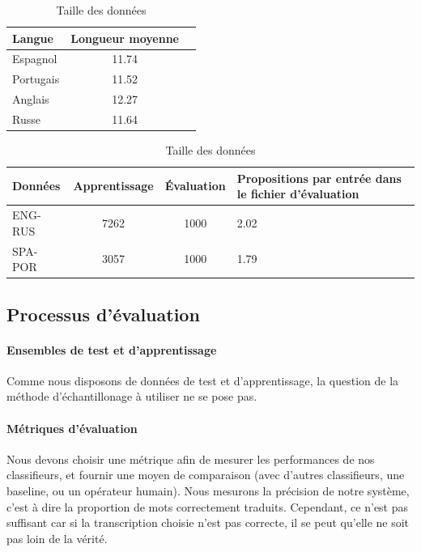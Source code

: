 \documentclass{article}
\begin{document}
\begin{table}[H]
\caption{Longueur moyenne des mots dans les données}
\label{table_len}
\label{table1}
\begin{center}
\begin{tabular}{|l|c|c|}
\hline
Langue&Longueur moyenne\\
\hline
Espagnol&11.74\\
\hline
Portugais&11.52\\
\hline
\hline
Anglais&12.27\\
\hline
Russe&11.64\\
\hline
\end{tabular}
\end{center}

\caption{Taille des données}
\label{table2}
\begin{center}
    \begin{tabular}{|l|c|c|p{4cm}|}
\hline
Données&Apprentissage&Évaluation&Propositions par entrée dans le fichier d'évaluation\\
\hline
ENG-RUS&7262&1000&2.02\\
\hline
SPA-POR&3057&1000&1.79\\
\hline
\end{tabular}
\end{center}

\end{table}

\subsection{Processus d'évaluation}
\label{eval}
\paragraph{Ensembles de test et d'apprentissage}
Comme nous disposons de données de test et d'apprentissage, la question de la méthode d'échantillonage à utiliser ne se pose pas.

\paragraph{Métriques d'évaluation}
Nous devons choisir une métrique afin de mesurer les performances de nos classifieurs, et fournir une moyen de comparaison (avec d'autres classifieurs, une baseline, ou un opérateur humain).
Nous mesurons la précision de notre système, c'est à dire la proportion de mots correctement traduits. Cependant, ce n'est pas suffisant car si la transcription choisie n'est pas correcte, il se peut qu'elle ne soit pas loin de la vérité.
\end{document}
